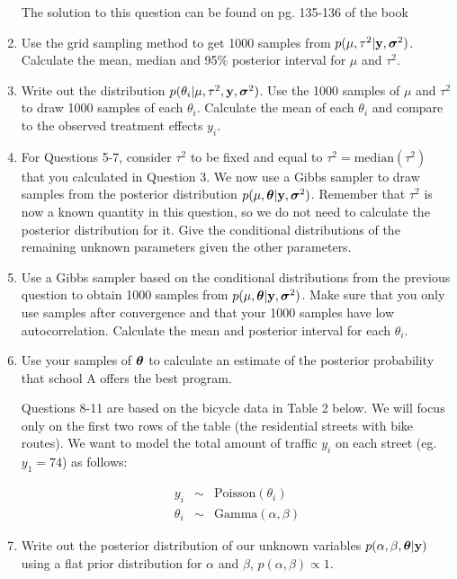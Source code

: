 \documentclass[12pt]{article}
\def\y{\mathbf{y}}
\newcommand{\si}{\mbox{\boldmath $\sigma$}}
\newcommand{\bth}{\mbox{\boldmath $\theta$}}
\begin{document}
\begin{enumerate}
	The solution to this question can be found on pg. 135-136 of the book
	
	\item Use the grid sampling method to get 1000 samples from $p(\mu,\tau^2|\y,\si^2)$. Calculate the mean, median and 95\% posterior interval for $\mu$ and $\tau^2$.
	
	\item Write out the distribution $p(\theta_i|\mu,\tau^2,\y,\si^2)$. Use the 1000 samples of $\mu$ and $\tau^2$ to draw 1000 samples of each $\theta_i$. Calculate the mean of each $\theta_i$ and compare to the observed treatment effects $y_i$.
	
	\item For Questions 5-7, consider $\tau^2$ to be fixed and equal to $\tau^2 = \mbox{median}(\tau^2)$ that you calculated in Question 3. We now use a Gibbs sampler to draw samples from the posterior distribution $p(\mu,\bth|\y,\si^2)$. Remember that $\tau^2$ is now a known quantity in this question, so we do not need to calculate the posterior distribution for it. Give the conditional distributions of the remaining unknown parameters given the other parameters.
	
	\item Use a Gibbs sampler based on the conditional distributions from the previous question to obtain 1000 samples from $p(\mu,\bth|\y,\si^2)$. Make sure that you only use samples after convergence and that your 1000 samples have low autocorrelation. Calculate the mean and posterior interval for each $\theta_i$.
	
	\item Use your samples of $\bth$ to calculate an estimate of the posterior probability that school A offers the best program.
	
	\vspace{.05cm} Questions 8-11 are based on the bicycle data in Table 2 below. We will focus only on the first two rows of the table (the residential streets with bike routes). We want to model the total amount of traffic $y_i$ on each street (eg. $y_1=74$) as follows:
	
	\begin{eqnarray*}
		y_i & \sim & \mbox{Poisson}(\theta_i)\\
		\theta_i & \sim & \mbox{Gamma}(\alpha,\beta) 
	\end{eqnarray*}
	
	\item Write out the posterior distribution of our unknown variables $p(\alpha,\beta,\bth|\y)$ using a flat prior distribution for $\alpha$ and $\beta$, $p(\alpha,\beta) \propto 1$.
	

\end{enumerate}
\end{document}
